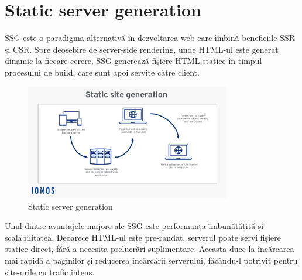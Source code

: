\documentclass[12pt, a4paper]{report}
\begin{document}
\section{Static server generation}

SSG este o paradigma alternativă în dezvoltarea web care îmbină beneficiile SSR și CSR. Spre deosebire de server-side rendering, unde HTML-ul este generat dinamic la fiecare cerere, SSG generează fișiere HTML statice în timpul procesului de build, care sunt apoi servite către client.

\begin{figure}[htbp]
	\centering
	\includegraphics[width=0.8\textwidth]{ssg-diagram.png}
	\caption{Static server generation}
	\label{fig:ssg}
\end{figure}

Unul dintre avantajele majore ale SSG este performanța îmbunătățită și scalabilitatea. Deoarece HTML-ul este pre-randat, serverul poate servi fișiere statice direct, fără a necesita prelucrări suplimentare. Aceasta duce la încărcarea mai rapidă a paginilor și reducerea încărcării serverului, făcându-l potrivit pentru site-urile cu trafic intens. 
\end{document}
